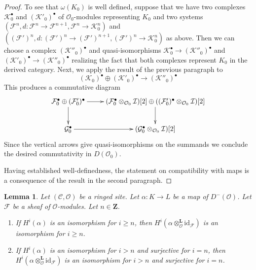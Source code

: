 \documentclass[10pt,a4paper]{amsart}
\theoremstyle{plain}
\newtheorem{lemma}[subsection]{Lemma}
\theoremstyle{definition}
\theoremstyle{remark}
\numberwithin{equation}{subsection}
\begin{document}
\begin{proof}
\medskip\noindent
To see that $\omega(K_0)$ is well defined, suppose that we have two complexes
$\mathcal{K}_0^\bullet$ and $(\mathcal{K}'_0)^\bullet$
of $\mathcal{O}_0$-modules representing $K_0$ and two systems
$(\mathcal{F}^n, d : \mathcal{F}^n \to \mathcal{F}^{n + 1},
\mathcal{F}^n \to \mathcal{K}_0^n)$
and
$((\mathcal{F}')^n, d : (\mathcal{F}')^n \to (\mathcal{F}')^{n + 1},
(\mathcal{F}')^n \to \mathcal{K}_0^n)$
as above. Then we can choose a complex $(\mathcal{K}''_0)^\bullet$
and quasi-isomorphisms
$\mathcal{K}_0^\bullet  \to (\mathcal{K}''_0)^\bullet$
and
$(\mathcal{K}'_0)^\bullet  \to (\mathcal{K}''_0)^\bullet$
realizing the fact that both complexes represent $K_0$ in the
derived category. Next, we apply the result of the previous paragraph
to
$$
(\mathcal{K}_0)^\bullet \oplus (\mathcal{K}'_0)^\bullet
\longrightarrow
(\mathcal{K}''_0)^\bullet
$$
This produces a commutative diagram
$$
\xymatrix{
\mathcal{F}_0^\bullet \oplus (\mathcal{F}'_0)^\bullet
\ar[d] \ar[r] &
(\mathcal{F}_0^\bullet \otimes_{\mathcal{O}_0} \mathcal{I})[2] \oplus
((\mathcal{F}'_0)^\bullet \otimes_{\mathcal{O}_0} \mathcal{I})[2] \ar[d] \\
\mathcal{G}_0^\bullet \ar[r] &
(\mathcal{G}_0^\bullet \otimes_{\mathcal{O}_0} \mathcal{I})[2]
}
$$
Since the vertical arrows give quasi-isomorphisms on the summands
we conclude the desired commutativity in $D(\mathcal{O}_0)$.

\medskip\noindent
Having established well-definedness, the statement on compatibility
with maps is a consequence of the result in the second
paragraph.
\end{proof}

\begin{lemma}
\label{lemma-induced-map}
Let $(\mathcal{C}, \mathcal{O})$ be a ringed site.
Let $\alpha : K \to L$ be a map of $D^-(\mathcal{O})$.
Let $\mathcal{F}$ be a sheaf of $\mathcal{O}$-modules.
Let $n \in \mathbf{Z}$.
\begin{enumerate}
\item If $H^i(\alpha)$ is an isomorphism for $i \geq n$,
then $H^i(\alpha \otimes_\mathcal{O}^\mathbf{L} \text{id}_\mathcal{F})$
is an isomorphism for $i \geq n$.
\item If $H^i(\alpha)$ is an isomorphism for $i > n$ 
and surjective for $i = n$,
then $H^i(\alpha \otimes_\mathcal{O}^\mathbf{L} \text{id}_\mathcal{F})$
is an isomorphism for $i > n$ and surjective for $i = n$.
\end{enumerate}
\end{lemma}
\end{document}
